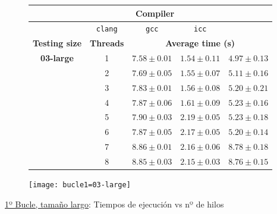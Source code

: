 \begin{figure}[H]
    \centering
    \begin{subfigure}{0.4\textwidth}
        \begin{adjustbox}{width=\textwidth} 
        \begin{tabular}{|c|c|c|c|c|}
            \hline
            \rowcolor{azul} \multicolumn{2}{|c|}{}&\multicolumn{3}{c|}{\textbf{Compiler}} \\ \hline
            \rowcolor{azul} \multicolumn{2}{|c|}{}&\texttt{clang}&\texttt{gcc}&\texttt{icc}\\ \hline
            \rowcolor{azul} \textbf{Testing size} & \textbf{Threads}&\multicolumn{3}{c|}{\textbf{Average time (s)}} \\ \hline
            \multirow{8}{1cm}{\textbf{03-large}} & 1 & \(7.58\pm{0.01}\) & \(1.54\pm{0.11}\) & \(4.97\pm{0.13}\) \\ \cline{2-5}
            & 2 & \(7.69\pm{0.05}\) & \(1.55\pm{0.07}\) & \(5.11\pm{0.16}\) \\ \cline{2-5}
            & 3 & \(7.83\pm{0.01}\) & \(1.56\pm{0.08}\) & \(5.20\pm{0.21}\) \\ \cline{2-5}
            & 4 & \(7.87\pm{0.06}\) & \(1.61\pm{0.09}\) & \(5.23\pm{0.16}\) \\ \cline{2-5}
            & 5 & \(7.90\pm{0.03}\) & \(2.19\pm{0.05}\) & \(5.23\pm{0.18}\) \\ \cline{2-5}
            & 6 & \(7.87\pm{0.05}\) & \(2.17\pm{0.05}\) & \(5.20\pm{0.14}\) \\ \cline{2-5}
            & 7 & \(8.86\pm{0.01}\) & \(2.16\pm{0.06}\) & \(8.78\pm{0.18}\) \\ \cline{2-5}
            & 8 & \(8.85\pm{0.03}\) & \(2.15\pm{0.03}\) & \(8.76\pm{0.15}\) \\ \hline
        \end{tabular}
        \end{adjustbox}
    \end{subfigure}
    \hfill
    \begin{subfigure}{0.5\textwidth}
        \texttt{[image: bucle1=03-large]}
    \end{subfigure}
    \caption{\underline{1º Bucle, tamaño largo}: Tiempos de ejecución vs nº de hilos}
    \label{bucle1=03-large}
\end{figure}